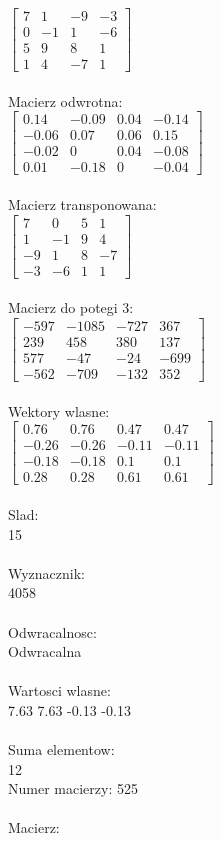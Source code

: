 \documentclass[a4paper,12pt]{article}
\begin{document}
$\begin{bmatrix} 7&1&-9&-3\\0&-1&1&-6\\5&9&8&1\\1&4&-7&1 \end{bmatrix}$
\\
\\
Macierz odwrotna:\\

$\begin{bmatrix} 0.14&-0.09&0.04&-0.14\\-0.06&0.07&0.06&0.15\\-0.02&0&0.04&-0.08\\0.01&-0.18&0&-0.04 \end{bmatrix}$
\\
\\
Macierz transponowana:\\

$\begin{bmatrix} 7&0&5&1\\1&-1&9&4\\-9&1&8&-7\\-3&-6&1&1 \end{bmatrix}$
\\
\\
Macierz do potegi 3:\\

$\begin{bmatrix} -597&-1085&-727&367\\239&458&380&137\\577&-47&-24&-699\\-562&-709&-132&352 \end{bmatrix}$
\\
\\
Wektory wlasne:\\

$\begin{bmatrix} 0.76&0.76&0.47&0.47\\-0.26&-0.26&-0.11&-0.11\\-0.18&-0.18&0.1&0.1\\0.28&0.28&0.61&0.61 \end{bmatrix}$
\\
\\
Slad:\\
15
\\
\\
Wyznacznik:\\
4058
\\
\\
Odwracalnosc:\\
Odwracalna
\\
\\
Wartosci wlasne:\\
7.63 7.63 -0.13 -0.13
\\
\\
Suma elementow:\\
12
\\
\newpage
Numer macierzy:
525
\\
\\
Macierz:\\
\end{document}
